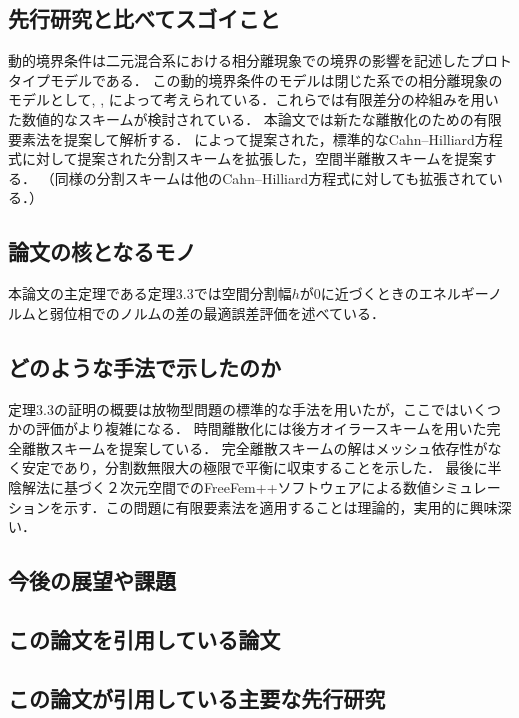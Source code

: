 \documentclass[openary, a4paper, oneside]{jsarticle}
\begin{document}
    \subsection{先行研究と比べてスゴイこと}
    動的境界条件は二元混合系における相分離現象での境界の影響を記述したプロトタイプモデルである．
    この動的境界条件のモデルは閉じた系での相分離現象のモデルとして\cite{Fischer,Maass,Dieterich1997}, \cite{Fischer,Maass,Dieterich1998}, \cite{KenzlerETAL2001}によって考えられている．これらでは有限差分の枠組みを用いた数値的なスキームが検討されている．
    本論文では新たな離散化のための有限要素法を提案して解析する．
    \cite{Elliott,French,Milner(1989)}によって提案された，標準的なCahn--Hilliard方程式に対して提案された分割スキームを拡張した，空間半離散スキームを提案する．
    （同様の分割スキームは他のCahn--Hilliard方程式に対しても拡張されている．）
    \subsection{論文の核となるモノ}
    本論文の主定理である定理3.3では空間分割幅$h$が0に近づくときのエネルギーノルムと弱位相でのノルムの差の最適誤差評価を述べている．
    \subsection{どのような手法で示したのか}
    定理3.3の証明の概要は放物型問題の標準的な手法を用いたが，ここではいくつかの評価がより複雑になる．
    時間離散化には後方オイラースキームを用いた完全離散スキームを提案している．
    完全離散スキームの解はメッシュ依存性がなく安定であり，分割数無限大の極限で平衡に収束することを示した．
    最後に半陰解法に基づく２次元空間でのFreeFem++ソフトウェアによる数値シミュレーションを示す．この問題に有限要素法を適用することは理論的，実用的に興味深い．
    \subsection{今後の展望や課題}
    \subsection{この論文を引用している論文}
    \subsection{この論文が引用している主要な先行研究}
\end{document}
